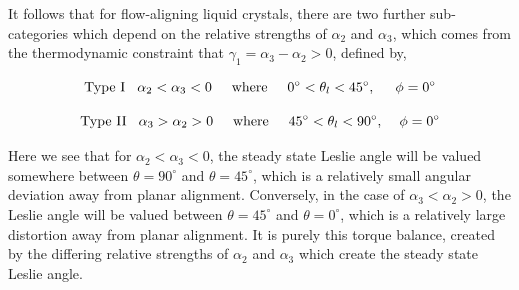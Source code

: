 \noindent It follows that for flow-aligning liquid crystals, there are two further sub-categories which depend on the relative strengths of $\alpha_2$ and $\alpha_3$, which comes from the thermodynamic constraint that $\gamma_1=\alpha_3-\alpha_ 2>0$, defined by,

\begin{equation}
\textrm{Type I}\hspace{0.3cm}\alpha_2<\alpha_3<0\hspace{0.5cm}\textrm{where}\hspace{0.5cm}0^{\circ}<\theta_l<45^{\circ},\hspace{0.5cm}\phi=0^{\circ}
\end{equation}

\begin{equation}
\textrm{Type II}\hspace{0.3cm}\alpha_3>\alpha_2>0\hspace{0.5cm}\textrm{where}\hspace{0.5cm}45^{\circ}<\theta_l<90^{\circ},\hspace{0.4cm}\phi=0^{\circ}
\end{equation}

\noindent Here we see that for $\alpha_2<\alpha_3<0$, the steady state Leslie angle will be valued somewhere between $\theta=90^{\circ}$ and $\theta=45^{\circ}$, which is a relatively small angular deviation away from planar alignment. Conversely, in the case of $\alpha_3<\alpha_2>0$, the Leslie angle will be valued between $\theta=45^{\circ}$ and $\theta=0^{\circ}$, which is a relatively large distortion away from planar alignment. It is purely this torque balance, created by the differing relative strengths of $\alpha_2$ and $\alpha_3$ which create the steady state Leslie angle.

